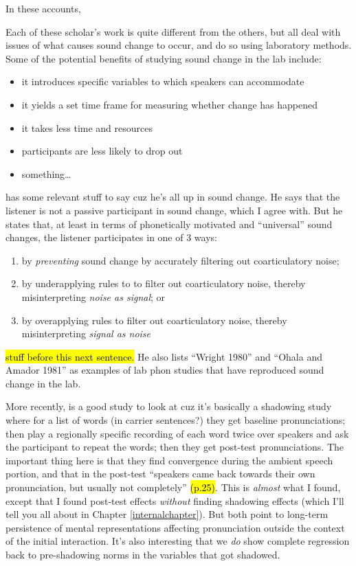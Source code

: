     In these accounts, 
    
    Each of these scholar's work is quite different from the others, but all deal with issues of what causes sound change to occur, and do so using laboratory methods. Some of the potential benefits of studying sound change in the lab include:
    \begin{itemize}
        \item it introduces specific variables to which speakers can accommodate
        \item it yields a set time frame for measuring whether change has happened
        \item it takes less time and resources
        \item participants are less likely to drop out
        \item something\ldots{}
    \end{itemize}
    
    \cite{ohala1981listener} has some relevant stuff to say cuz he's all up in sound change. He says that the listener is not a passive participant in sound change, which I agree with. But he states that, at least in terms of phonetically motivated and ``universal'' sound changes, the listener participates in one of 3 ways:
    \begin{enumerate}
        \item by \emph{preventing} sound change by accurately filtering out coarticulatory noise;
        \item by underapplying rules to to filter out coarticulatory noise, thereby misinterpreting \emph{noise as signal}; or
        \item by overapplying rules to filter out coarticulatory noise, thereby misinterpreting \emph{signal as noise}
    \end{enumerate}
    \hl{stuff before this next sentence.} He also lists ``Wright 1980'' and ``Ohala and Amador 1981'' as examples of lab phon studies that have reproduced sound change in the lab.
    
    More recently, \cite{delvaux2007influence} is a good study to look at cuz it's basically a shadowing study where for a list of words (in carrier sentences?) they get baseline pronunciations; then play a regionally specific recording of each word twice over speakers and ask the participant to repeat the words; then they get post-test pronunciations. The important thing here is that they find convergence during the ambient speech portion, and that in the post-test ``speakers came back towards their own pronunciation, but usually not completely'' \hl{(p.25)}. This is \emph{almost} what I found, except that I found post-test effects \emph{without} finding shadowing effects (which I'll tell you all about in Chapter \ref{internalchapter}). But both point to long-term persistence of mental representations affecting pronunciation outside the context of the initial interaction. It's also interesting that we \emph{do} show complete regression back to pre-shadowing norms in the variables that got shadowed.
    
